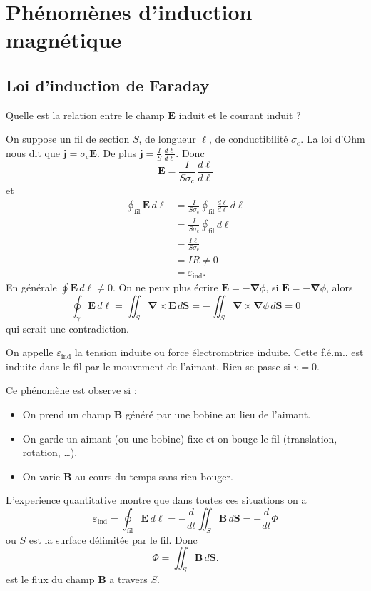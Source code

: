 \chapter{Phénomènes d'induction magnétique}
\section{Loi d'induction de Faraday}
\begin{question}
Quelle est la relation entre le champ $\boldsymbol{E}$ induit et le courant induit ?
\end{question}
On suppose un fil de section $S$, de longueur $\ell$, de conductibilité $\sigma _{\mathrm{c}}$. La loi d'Ohm nous dit que $\boldsymbol{j}=\sigma _{\mathrm{c}}\boldsymbol{E}$. De plus $\boldsymbol{j}=\frac{I}{S}\, \frac{d\boldsymbol{\ell}}{d \ell}$. Donc
$$
\boldsymbol{E}=\frac{I}{S\sigma _{\mathrm{c}}}\, \frac{d\boldsymbol{\ell}}{d \ell}
$$
et
\begin{align*}
\oint _{\mathrm{fil}}\boldsymbol{E}\,d\boldsymbol{\ell} & =\frac{I}{S\sigma _{\mathrm{c}}}\oint _{\mathrm{fil}} \frac{d\boldsymbol{\ell}}{d\ell}\,d\boldsymbol{\ell} \\
 & =\frac{I}{S\sigma _{\mathrm{c}}}\oint _{\mathrm{fil}}d\ell \\
 & =\frac{I\ell}{S\sigma _{\mathrm{c}}} \\
 & =IR\neq 0 \\
 & =\varepsilon _{\mathrm{ind}}.
\end{align*}
En générale $\oint \boldsymbol{E}\,d\boldsymbol{\ell}\neq0$. On ne peux plus écrire $\boldsymbol{E}=-\boldsymbol{\nabla}\phi$, si $\boldsymbol{E}=-\boldsymbol{\nabla}\phi$, alors 
$$
\oint _{\gamma}\boldsymbol{E}\,d\boldsymbol{\ell}=\iint _{S}\boldsymbol{\nabla}\times \boldsymbol{E}\,d\boldsymbol{S}=-\iint _{S}\boldsymbol{\nabla}\times \boldsymbol{\nabla}\phi\,d\boldsymbol{S}=0
$$
qui serait une contradiction. 

On appelle $\varepsilon _{\mathrm{ind}}$ la tension induite ou force électromotrice induite. Cette f.é.m.. est induite dans le fil par le mouvement de l'aimant. Rien se passe si $v=0$.

Ce phénomène est observe si :
\begin{itemize}
\item On prend un champ $\boldsymbol{B}$ généré par une bobine au lieu de l'aimant. 
\item On garde un aimant (ou une bobine) fixe et on bouge le fil (translation, rotation, \dots).
\item On varie $\boldsymbol{B}$ au cours du temps sans rien bouger.
\end{itemize}
\begin{theorem}
L'experience quantitative montre que dans toutes ces situations on a
$$
\varepsilon _{\mathrm{ind}}=\oint _{\mathrm{fil}}\boldsymbol{E}\,d\boldsymbol{\ell}=-\frac{d}{dt}\iint _{S}\boldsymbol{B}\,d\boldsymbol{S}=-\frac{d}{dt} \Phi
$$
ou $S$ est la surface délimitée par le fil. Donc
$$
\Phi=\iint _{S}\boldsymbol{B}\,d\boldsymbol{S}.
$$
est le flux du champ $\boldsymbol{B}$ a travers $S$.
\end{theorem}